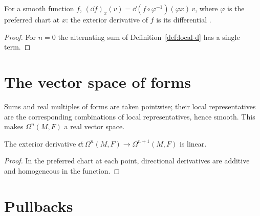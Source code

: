 \begin{proposition}
  \label{prop:d-function}
  \leanok
  For a smooth function $f$, $(\dd f)_x(v) = \dd(f \circ \varphi^{-1})(\varphi x)\, v$, where
  $\varphi$ is the preferred chart at $x$: the exterior derivative of $f$ is its differential
  \cite[Remark~3.6.12(a)]{GN26}.
\end{proposition}

\begin{proof}
  \leanok
  For $n = 0$ the alternating sum of Definition~\ref{def:local-d} has a single term.
\end{proof}

\section{The vector space of forms}

\begin{definition}
  \label{def:forms-linear}
  \leanok
  Sums and real multiples of forms are taken pointwise; their local representatives are the
  corresponding combinations of local representatives, hence smooth. This makes
  $\Omega^n(M, F)$ a real vector space.
\end{definition}

\begin{proposition}
  \label{prop:d-linear}
  \leanok
  The exterior derivative $\dd \colon \Omega^n(M, F) \to \Omega^{n+1}(M, F)$ is linear.
\end{proposition}

\begin{proof}
  \leanok
  In the preferred chart at each point, directional derivatives are additive and homogeneous in
  the function.
\end{proof}

\section{Pullbacks}

